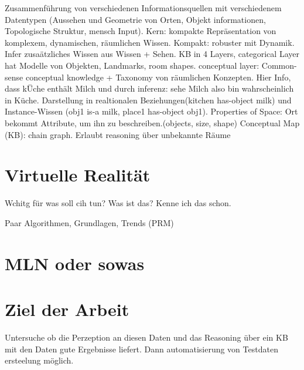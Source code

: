\cite{pronobis1} \newline
Zusammenführung von verschiedenen Informationsquellen mit verschiedenem Datentypen (Aussehen und Geometrie von Orten, Objekt informationen, Topologische Struktur, mensch Input). Kern: kompakte Repräsentation von komplexem, dynamischen, räumlichen Wissen. \newline
Kompakt: robuster mit Dynamik. \newline
Infer zusaätzliches Wissen aus Wissen + Sehen. \newline
KB in 4 Layers, categorical Layer hat Modelle von Objekten, Landmarks, room shapes. \newline
conceptual layer: Common-sense conceptual knowledge + Taxonomy von räumlichen Konzepten. Hier Info, dass kÜche enthält Milch und durch inferenz: sehe Milch also bin wahrscheinlich in Küche. Darstellung in realtionalen Beziehungen(kitchen has-object milk) und Instance-Wissen (obj1 is-a milk, place1 has-object obj1).\newline
Properties of Space: Ort bekommt Attribute, um ihn zu beschreiben.(objects, size, shape) \newline
Conceptual Map (KB): chain graph. Erlaubt reasoning über unbekannte Räume







\section{Virtuelle Realität}

Wchitg für was soll cih tun? Was ist das? Kenne ich das schon.

Paar Algorithmen, Grundlagen, Trends (PRM) 

\section{MLN oder sowas}

\section{Ziel der Arbeit}
\label{sec:goal}

Untersuche ob die Perzeption an diesen Daten und das Reasoning über ein KB mit den Daten gute Ergebnisse liefert. Dann automatisierung von Testdaten ersteelung möglich. 